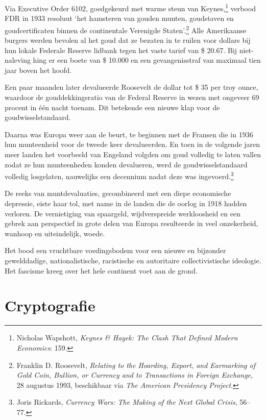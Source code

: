 \documentclass[
  a5paper,
  smalldemyvopaper,11pt,twoside,onecolumn,openright,extrafontsizes,
hidelinks]{memoir}
\begin{document}
Via Executive Order 6102, goedgekeurd met warme steun van
Keynes,\footnote{\hspace{0pt}Nicholas Wapshott, \emph{Keynes \& Hayek:
  The Clash That Defined Modern Economics}: 159.} verbood FDR in 1933
resoluut `het hamsteren van gouden munten, goudstaven en
goudcertificaten binnen de continentale Verenigde Staten'.\footnote{\hspace{0pt}Franklin
  D. Roosevelt, \emph{Relating to the Hoarding, Export, and Earmarking
  of Gold Coin, Bullion, or Currency and to Transactions in Foreign
  Exchange}, 28 augustus 1993, beschikbaar via \emph{The American
  Presidency Project}.} Alle Amerikaanse burgers werden bevolen al het
goud dat ze bezaten in te ruilen voor dollars bij hun lokale Federale
Reserve lidbank tegen het vaste tarief van \$ 20.67. Bij niet-naleving
hing er een boete van \$ 10.000 en een gevangenisstraf van maximaal tien
jaar boven het hoofd.

Een paar maanden later devalueerde Roosevelt de dollar tot \$ 35 per
troy ounce, waardoor de gouddekkingsratio van de Federal Reserve in
wezen met ongeveer 69 procent in één nacht toenam. Dit betekende een
nieuwe klap voor de goudwisselstandaard.

Daarna was Europa weer aan de beurt, te beginnen met de Fransen die in
1936 hun munteenheid voor de tweede keer devalueerden. En toen in de
volgende jaren meer landen het voorbeeld van Engeland volgden om goud
volledig te laten vallen zodat ze hun munteenheden konden devalueren,
werd de goudwisselstandaard volledig losgelaten, nauwelijks een
decennium nadat deze was ingevoerd.\footnote{\hspace{0pt}Joris Rickards,
  \emph{Currency Wars: The Making of the Next Global Crisis}, 56--77.}

De reeks van muntdevaluaties, gecombineerd met een diepe economische
depressie, eiste haar tol, met name in de landen die de oorlog in 1918
hadden verloren. De vernietiging van spaargeld, wijdverspreide
werkloosheid en een gebrek aan perspectief in grote delen van Europa
resulteerde in veel onzekerheid, wanhoop en uiteindelijk, woede.

Het bood een vruchtbare voedingsbodem voor een nieuwe en bijzonder
gewelddadige, nationalistische, racistische en autoritaire
collectivistische ideologie. Het fascisme kreeg over het hele continent
voet aan de grond.

\chapter{Cryptografie}\label{cryptografie}
\end{document}
